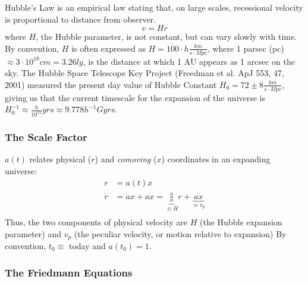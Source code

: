 \documentclass{article}
\def\aa{\frac{\dot a }{ a}}
\begin{document}
Hubble's Law is an empirical law stating that, on large scales, recessional 
velocity is proportional to distance from observer.
$$\boxed{v=Hr}$$ 
where $H$, the Hubble parameter, is not constant, but can
vary slowly with time.  By convention, $H$ is often expressed as
$H=100\cdot h\frac{km}{ s\cdot Mpc}$, where 1 parsec (pc) $\approx3\cdot10^{18}cm
=3.26ly$, is the distance at which 1 AU appears as 1 arcsec on the sky.  
The Hubble Space Telescope Key Project (Freedman et al. ApJ 553, 47, 2001)
measured the present day value of Hubble Constant 
$H_0=72\pm 8\frac{km}{ s\cdot Mpc}$, giving us that the current timescale for
the expansion of the universe is 
$H_0^{-1}\approx\frac{h}{ 10^{11}}yrs\approx 9.778h^{-1}Gyrs$.

\subsubsection{ The Scale Factor }

$a(t)$ relates physical ($r$) and {\it comoving} ($x$) coordinates in an
expanding universe:
\begin{align}
r&=a(t)x\\
\dot r&=\dot ax+a\dot x=\underbrace{\aa}_{\equiv H}r+\underbrace{a\dot x}_{\equiv v_p}\\
\end{align}
Thus, the two components of physical velocity are $H$ (the Hubble expansion 
parameter) and $v_p$ (the peculiar velocity, or motion relative to expansion)
By convention, $t_0 \equiv$ today and $a(t_0)=1$.

\subsubsection{ The Friedmann Equations}
\end{document}
